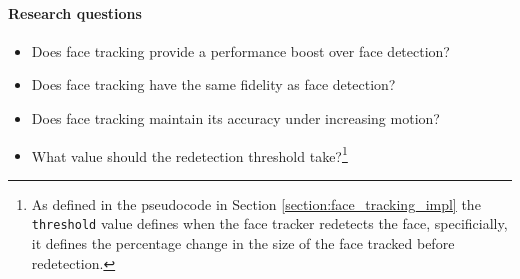 \paragraph{Research questions}
\begin{itemize}
    \item Does face tracking provide a performance boost over face detection?
    \item Does face tracking have the same fidelity as face detection?
    \item Does face tracking maintain its accuracy under increasing motion?
    \item What value should the redetection threshold take?\footnote{As defined in the pseudocode in Section \ref{section:face_tracking_impl} the \texttt{threshold} value defines when the face tracker redetects the face, specificially, it defines the percentage change in the size of the face tracked before redetection. }
\end{itemize}
